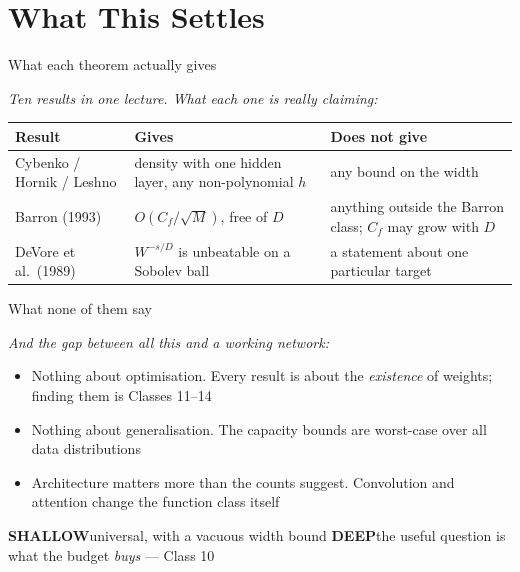 \documentclass[aspectratio=169, 11pt]{beamer}
\newcommand{\shpar}[2]{%
  \vfill
  {\scriptsize
  \begin{tcolorbox}[enhanced, sidebyside, sidebyside align=top,
                    lefthand ratio=0.485,
                    segmentation style={shc!35, line width=0.6pt},
                    colback=shc!5, colframe=shc!35, boxrule=0.5pt,
                    arc=1.2mm, left=1.6mm, right=1.6mm,
                    top=0.6mm, bottom=0.6mm,
                    before skip=0pt, after skip=0pt]
    {\color{shc}\textbf{SHALLOW}}\hspace{0.55em}#1
  \tcblower
    {\color{dpc}\textbf{DEEP}}\hspace{0.55em}#2
  \end{tcolorbox}}%
  \vspace{0.35em}%
}
\newcommand{\bridge}[1]{%
  {\scriptsize\itshape\color{mcMuted} #1\par}\vspace{0.35em}}
\newcommand{\nosrc}{}       %
\begin{document}
\section{What This Settles}

\begin{frame}{What each theorem actually gives}
  \nosrc
  \bridge{Ten results in one lecture. What each one is really claiming:}
  \centering
  \vspace{0.2em}
  \renewcommand{\arraystretch}{1.22}
  {\scriptsize
  \begin{tabular}{p{} p{}
                  p{}}
    \textbf{Result} & \textbf{Gives} & \textbf{Does not give}\\
    \hline
    Cybenko / Hornik / Leshno
      & density with one hidden layer, any non-polynomial $h$
      & any bound on the width\\
    Barron (1993)
      & $O(C_f/\sqrt{M})$, free of $D$
      & anything outside the Barron class; $C_f$ may grow with $D$\\
    DeVore et al.\ (1989)
      & $W^{-s/D}$ is unbeatable on a Sobolev ball
      & a statement about one particular target\\
    \hline
  \end{tabular}}
\end{frame}

\begin{frame}{What none of them say}
  \nosrc
  \bridge{And the gap between all this and a working network:}
  \vspace{0.2em}
  \begin{itemize}\setlength{\itemsep}{0pt}
    \item \alert{Nothing about optimisation.} Every result is about the
          \emph{existence} of weights; finding them is Classes 11--14
    \item \alert{Nothing about generalisation.} The capacity bounds
          are worst-case over all data distributions
    \item \alert{Architecture matters more than the counts suggest.}
          Convolution and attention change the function class itself
  \end{itemize}
  \shpar{universal, with a vacuous width bound}
        {the useful question is what the budget \emph{buys} --- Class 10}
\end{frame}
\end{document}
